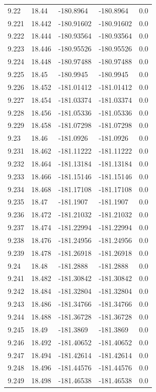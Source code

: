 \begin{tabular}{lllll}
9.22 & 18.44 & -180.8964 & -180.8964 & 0.0 \\
9.221 & 18.442 & -180.91602 & -180.91602 & 0.0 \\
9.222 & 18.444 & -180.93564 & -180.93564 & 0.0 \\
9.223 & 18.446 & -180.95526 & -180.95526 & 0.0 \\
9.224 & 18.448 & -180.97488 & -180.97488 & 0.0 \\
9.225 & 18.45 & -180.9945 & -180.9945 & 0.0 \\
9.226 & 18.452 & -181.01412 & -181.01412 & 0.0 \\
9.227 & 18.454 & -181.03374 & -181.03374 & 0.0 \\
9.228 & 18.456 & -181.05336 & -181.05336 & 0.0 \\
9.229 & 18.458 & -181.07298 & -181.07298 & 0.0 \\
9.23 & 18.46 & -181.0926 & -181.0926 & 0.0 \\
9.231 & 18.462 & -181.11222 & -181.11222 & 0.0 \\
9.232 & 18.464 & -181.13184 & -181.13184 & 0.0 \\
9.233 & 18.466 & -181.15146 & -181.15146 & 0.0 \\
9.234 & 18.468 & -181.17108 & -181.17108 & 0.0 \\
9.235 & 18.47 & -181.1907 & -181.1907 & 0.0 \\
9.236 & 18.472 & -181.21032 & -181.21032 & 0.0 \\
9.237 & 18.474 & -181.22994 & -181.22994 & 0.0 \\
9.238 & 18.476 & -181.24956 & -181.24956 & 0.0 \\
9.239 & 18.478 & -181.26918 & -181.26918 & 0.0 \\
9.24 & 18.48 & -181.2888 & -181.2888 & 0.0 \\
9.241 & 18.482 & -181.30842 & -181.30842 & 0.0 \\
9.242 & 18.484 & -181.32804 & -181.32804 & 0.0 \\
9.243 & 18.486 & -181.34766 & -181.34766 & 0.0 \\
9.244 & 18.488 & -181.36728 & -181.36728 & 0.0 \\
9.245 & 18.49 & -181.3869 & -181.3869 & 0.0 \\
9.246 & 18.492 & -181.40652 & -181.40652 & 0.0 \\
9.247 & 18.494 & -181.42614 & -181.42614 & 0.0 \\
9.248 & 18.496 & -181.44576 & -181.44576 & 0.0 \\
9.249 & 18.498 & -181.46538 & -181.46538 & 0.0 \\

\end{tabular}

